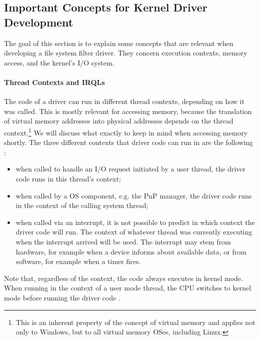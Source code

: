 \subsection{Important Concepts for Kernel Driver Development}
\label{chap:background.kerneldriver.concepts}
The goal of this section is to explain some concepts that are relevant when developing a file system filter driver. They concern execution contexts, memory access, and the kernel's I/O system.

\paragraph{Thread Contexts and IRQLs}
The code of a driver can run in different thread contexts, depending on how it was called. This is mostly relevant for accessing memory, because the translation of virtual memory addresses into physical addresses depends on the thread context.\footnote{\label{fn:background.kerneldriver.threadcontexts} This is an inherent property of the concept of virtual memory and applies not only to Windows, but to all virtual memory OSes, including Linux.} We will discuss what exactly to keep in mind when accessing memory shortly. The three different contexts that driver code can run in are the following \cite{Yosifovich2017}:
\begin{itemize}
	\item when called to handle an I/O request initiated by a user thread, the driver code runs in this thread's context;
	\item when called by a OS component, e.g. the PnP manager, the driver code runs in the context of the calling system thread;
	\item when called via an interrupt, it is not possible to predict in which context the driver code will run. The context of whatever thread was currently executing when the interrupt arrived will be used. The interrupt may stem from hardware, for example when a device informs about available data, or from software, for example when a timer fires.
\end{itemize}
Note that, regardless of the context, the code always executes in kernel mode. When running in the context of a user mode thread, the CPU switches to kernel mode before running the driver code \cite{Yosifovich2017}.

